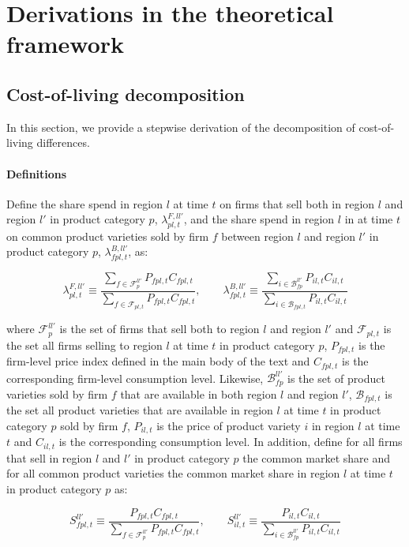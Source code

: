 \section{Derivations in the theoretical framework}
\subsection{Cost-of-living decomposition}\label{app:theory_cle}
In this section, we provide a stepwise derivation of the decomposition of cost-of-living differences. 

\paragraph{Definitions} Define the share spend in region $l$ at time $t$ on firms that sell both in region $l$ and region $l'$ in product category $p$, $\lambda^{F,ll'}_{pl,t}$, and the share spend in region $l$ in at time $t$ on common product varieties sold by firm $f$ between region $l$ and region $l'$ in product  category $p$, $\lambda^{B,ll'}_{fpl,t}$, as: 
\begin{linenomath*}
    \begin{equation*}
        \lambda^{F,ll'}_{pl,t} \equiv  
            \frac{\sum_{f \in \mathcal{F}^{ll'}_p}P_{fpl,t}C_{fpl,t}}
                 {\sum_{f \in \mathcal{F}_{pl,t}} P_{fpl,t}C_{fpl,t}}, \qquad 
        \lambda^{B,ll'}_{fpl,t} \equiv  
                 \frac{\sum_{i \in \mathcal{B}^{ll'}_{fp}}P_{il,t}C_{il,t}}
                      {\sum_{i \in \mathcal{B}_{fpl,t}} P_{il,t}C_{il,t}}
    \end{equation*}
\end{linenomath*}
\noindent where $\mathcal{F}^{ll'}_p$ is the set of firms that sell both to region $l$ and region $l'$ and $\mathcal{F}_{pl,t}$ is the set all firms selling to region $l$ at time $t$ in product category $p$, $P_{fpl,t}$ is the firm-level price index defined in the main body of the text and $C_{fpl,t}$ is the corresponding firm-level consumption level. Likewise, $\mathcal{B}^{ll'}_{fp}$ is the set of product varieties sold by firm $f$ that are available in both region $l$ and region $l'$, $\mathcal{B}_{fpl,t}$ is the set all product varieties that are available in region $l$ at time $t$ in product category $p$ sold by firm $f$, $P_{il,t}$ is the price of product variety $i$ in region $l$ at time $t$ and $C_{il,t}$ is the corresponding consumption level. In addition, define for all firms that sell in region $l$ and $l'$ in product category $p$ the common market share and for all common product varieties the common market share in region $l$ at time $t$ in product category $p$ as: 
\begin{linenomath*}
    \begin{equation*}
        S^{ll'}_{fpl,t} \equiv  
            \frac{P_{fpl,t}C_{fpl,t}}
                 {\sum_{f \in \mathcal{F}^{ll'}_{p}} P_{fpl,t}C_{fpl,t}}, \qquad 
        S^{ll'}_{il,t} \equiv  
                 \frac{P_{il,t}C_{il,t}}
                      {\sum_{i \in \mathcal{B}^{ll'}_{fp}} P_{il,t}C_{il,t}}
    \end{equation*}
\end{linenomath*}

